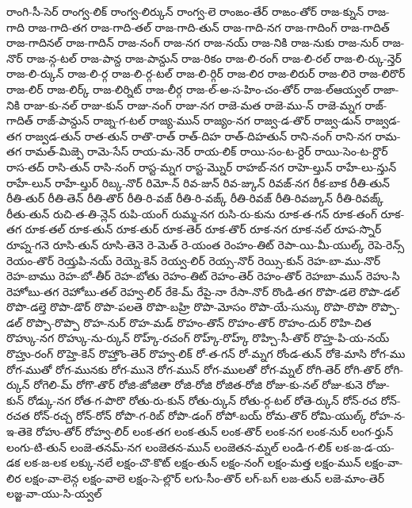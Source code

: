 {రాంగి-సీ-సెర్
రాంగ్వ-లిక్
రాంగ్వ-లిర్కున్
రాంగ్వ-లె
రాంఙం-తేర్
రాఙం-తోర్
రాజ-క్నున్
రాజ-గాది
రాజ-గాది-తగ
రాజ-గాది-తల్
రాజ-గాది-తున్
రాజ-గాది-నగ
రాజ-గాదింగ్
రాజ-గాదిత్
రాజ-గాదినల్
రాజ-గాదిన్
రాజ-నంగ్
రాజ-నగ
రాజ-నయ్
రాజ-నికి
రాజ-నుకు
రాజ-నుర్
రాజ-నొర్
రాజ-న్గ-టల్
రాజ-పాన్ద
రాజ-పాన్దున్
రాజ-రికం
రాజ-లి-రంగ్
రాజ-లి-రల్
రాజ-లి-ర్కు-న్తెర్
రాజ-లి-ర్కున్
రాజ-లి-ర్గ
రాజ-లి-ర్గ-టల్
రాజ-లి-ర్గిర్
రాజ-లిర
రాజ-లిరుర్
రాజ-లిరె
రాజ-లిరొర్
రాజ-లిర్
రాజ-లిర్క్
రాజ-లిర్నిట్
రాజ-లీర్గ
రాజ-ల్-అ-స-హిం-చం-తోర్
రాజ-ల్ఆయ్వల్
రాజా-నికి
రాజు-కు-నల్
రాజు-కున్
రాజు-నంగ్
రాజు-నగ
రాజె-మత
రాజె-ము-న్
రాజె-మ్నగ
రాజ్-గాదిత్
రాజ్-పాన్దున్
రాజ్న-గ-టల్
రాజ్య-మున్
రాజ్యం-నగ
రాజ్వ-డ-తొర్
రాజ్వ-డున్
రాజ్వడ-తగ
రాజ్వడ-తున్
రాత-తున్
రాతొ-రాత్
రాత్-దిహ
రాత్-దిహతున్
రాని-నంగ్
రాని-నగ
రామ-తగ
రామత్-మిజ్పె
రామె-సేస్
రాయ-మ-నెర్
రాయ-లిక్
రాయి-సం-ట-ర్దెర్
రాయి-సెం-ట-ర్దొర్
రాస-తద్
రాసి-తున్
రాసి-నంగ్
రాస్ట-మ్నగ
రాస్ట-మ్నొర్
రాహబ్-నగ
రాహె-ల్తున్
రాహే-లు-న్తున్
రాహే-లున్
రాహే-ల్తుర్
రిబ్క-నొర్
రిమో-న్
రివ-జున్
రివ-జ్కున్
రివజ్-నగ
రీక-బాక
రీతి-తున్
రీతి-తుర్
రీతి-తెన్
రీతి-తొర్
రీతి-రి-వజ్
రీతి-రి-వజ్క్
రీతి-రివజ్
రీతి-రివజ్కున్
రీతి-రివజ్క్
రీతు-తున్
రుచి-త-తి-న్లెన్
రుపి-యంగ్
రుమ్మ-నగ
రుసి-రు-కును
రూక-త-గన్
రూక-తంగ్
రూక-తగ
రూక-తల్
రూక-తున్
రూక-తుర్
రూక-తెర్
రూక-తొర్
రూక-నగ
రూక-నల్
రూప-స్నొర్
రూప్న-గనె
రూసి-తున్
రూసి-తెనె
రె-మెత్
రె-యంత
రెంహం-తిట్
రెపా-యి-మీ-యుల్క్
రెపె-రెన్స్
రెయం-తొర్
రెయ్తపి-నయ్
రెయ్నె-కెన్
రెయ్వ-లిర్
రెయ్స-నొర్
రెయ్సి-కున్
రెహ-బా-ము-నొర్
రెహ-బాము
రెహ-బో-తీర్
రెహ-బోతు
రెహం-తిట్
రెహం-తెర్
రెహం-తొర్
రెహబా-మున్
రెహు-సి
రెహోబు-తగ
రెహోబు-తల్
రెహ్వ-లిర్
రేకె-మ్
రేపై-నా
రేసా-నొర్
రొండి-తగ
రొపొ-డలె
రొపొ-డల్
రొపొ-డల్తె
రొపొ-డొర్
రొపొ-పలతె
రొపొ-బహ్రి
రొపొ-మోసం
రొపొ-యే-సున్కు
రొపొ-రొపొ
రొప్పొ-డల్
రొప్పొ-రొప్పొ
రొహ-నుర్
రొహ-మడ్
రొహం-తొన్
రొహం-తొర్
రొహం-దుర్
రొహి-చిత
రొహ్కు-నగ
రొహ్కు-ను-ర్కున్
రొహ్క్-రచంగ్
రొహ్క్-రొహ్క్
రొహ్చి-సీ-తొర్
రొహ్త-పి-య-నయ్
రొహ్తు-రంగ్
రొహ్తె-కెన్
రొహ్తొం-తెర్
రొహ్వ-లిక్
రో-త-గన్
రో-మ్నగ
రోండ-తున్
రోకె-మాసి
రోగ-ము
రోగ-ముతో
రోగ-మునకు
రోగ-మునె
రోగ-మున్
రోగ-ములతో
రోగ-మ్నల్
రోగి-తెర్
రోగి-తొర్
రోగి-ర్కున్
రోగెలి-మ్
రోగొ-తొర్
రోజి-జోజితా
రోజి-రోజి
రోజిత-రోజి
రోజు-కు-నల్
రోజు-కునె
రోజు-కున్
రోడ్కు-నగ
రోత-గ-పొరొ
రోతు-రు-కున్
రోతు-ర్కున్
రోతు-ర్గ-టల్
రోతె-ర్కున్
రోన్-రచ
రోన్-రచత
రోన్-రచ్చ
రోన్-రోన్
రోపొ-గ-రిబ్
రోపొ-డంగ్
రోపో-బయ్
రోమ-తొర్
రోమి-యుల్క్
రోహ-న-ఇ-తెకె
రోహు-తోర్
రోహ్వ-లిర్
లంక-తగ
లంక-తున్
లంక-తొర్
లంక-నగ
లంక-నుర్
లంగ-ర్తున్
లంగు-టి-తున్
లంజె-తనమ్-నగ
లంజెతన-మున్
లంజెతన-మ్నల్
లండి-గ-లిక్
లక-జ-డ-య-డక
లక-జ-లక
లక్కు-నలే
లక్షం-చొ-కొట్
లక్షం-తున్
లక్షం-నంగ్
లక్షం-మత్త
లక్షం-మున్
లక్షం-వా-లిర
లక్షం-వా-లెన్గ
లక్షం-వాలె
లక్షం-సె-ల్లొర్
లగు-సీం-తొర్
లగ్-బగ్
లజ-తున్
లజె-మాం-తెర్
లజ్జ-వా-యు-సి-య్వల్
}
